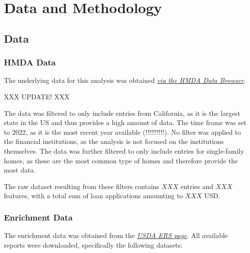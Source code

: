 \chapter{Data and Methodology}\label{ch:Data_and_Methodology}



\section{Data}\label{sec:Data}



\subsection{HMDA Data}\label{subsec:HMDA_Data}


The underlying data for this analysis was obtained \textit{\href{https://ffiec.cfpb.gov/data-browser/data/2022?category=states}{via the HMDA Data Browser}}. \@

XXX UPDATE! XXX

The data was filtered to only include entries from California, as it is the largest state in the US and thus provides a high amount of data. 
The time frame was set to 2022, as it is the most recent year available (!!!!!!!!!!). No filter was applied to the financial institutions, as the analysis is not focused on the institutions themselves. 
The data was further filtered to only include entries for single-family homes, as these are the most common type of homes and therefore provide the most data.

The raw dataset resulting from these filters contains $XXX$ entries and $XXX$ features, with a total sum of loan applications amounting to $XXX$ USD.

\subsection{Enrichment Data}\label{subsec:Enrichment_Data}


The enrichment data was obtained from the \textit{\href{https://www.ers.usda.gov/data-products/county-level-data-sets/}{USDA ERS page}}. All available reports were downloaded, specifically the following datasets:

